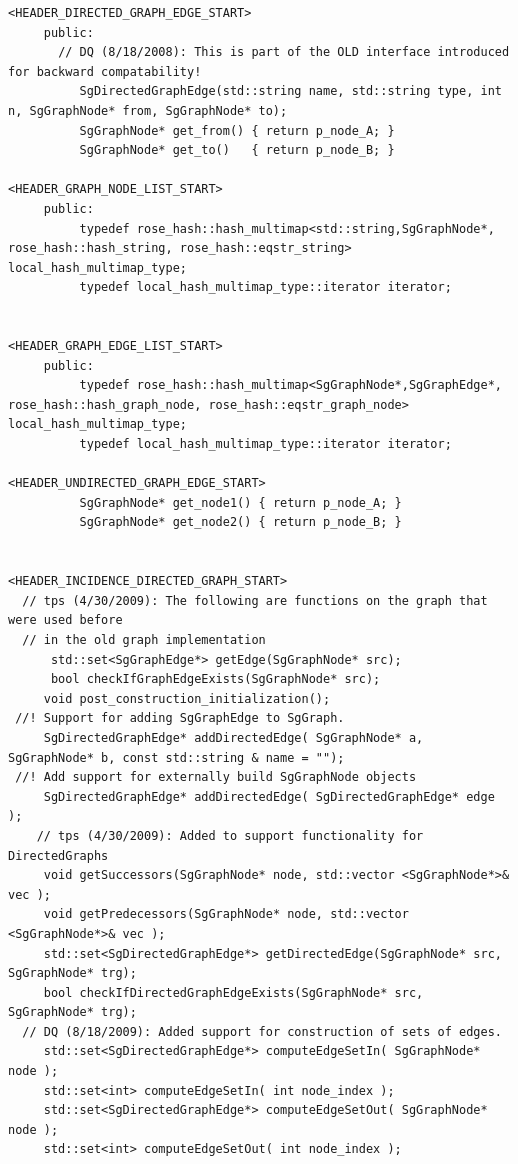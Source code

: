 \begin{enumerate}
\begin{lstlisting}
<HEADER_DIRECTED_GRAPH_EDGE_START>
     public:
       // DQ (8/18/2008): This is part of the OLD interface introduced for backward compatability!
          SgDirectedGraphEdge(std::string name, std::string type, int n, SgGraphNode* from, SgGraphNode* to);
          SgGraphNode* get_from() { return p_node_A; }
          SgGraphNode* get_to()   { return p_node_B; }

<HEADER_GRAPH_NODE_LIST_START>
     public:
          typedef rose_hash::hash_multimap<std::string,SgGraphNode*, rose_hash::hash_string, rose_hash::eqstr_string> local_hash_multimap_type;
          typedef local_hash_multimap_type::iterator iterator;


<HEADER_GRAPH_EDGE_LIST_START>
     public:
          typedef rose_hash::hash_multimap<SgGraphNode*,SgGraphEdge*, rose_hash::hash_graph_node, rose_hash::eqstr_graph_node> local_hash_multimap_type;
          typedef local_hash_multimap_type::iterator iterator;

<HEADER_UNDIRECTED_GRAPH_EDGE_START>
          SgGraphNode* get_node1() { return p_node_A; }
          SgGraphNode* get_node2() { return p_node_B; }


<HEADER_INCIDENCE_DIRECTED_GRAPH_START>
  // tps (4/30/2009): The following are functions on the graph that were used before 
  // in the old graph implementation
  	  std::set<SgGraphEdge*> getEdge(SgGraphNode* src);
  	  bool checkIfGraphEdgeExists(SgGraphNode* src);
     void post_construction_initialization();
 //! Support for adding SgGraphEdge to SgGraph.
     SgDirectedGraphEdge* addDirectedEdge( SgGraphNode* a, SgGraphNode* b, const std::string & name = "");
 //! Add support for externally build SgGraphNode objects
     SgDirectedGraphEdge* addDirectedEdge( SgDirectedGraphEdge* edge  );
	// tps (4/30/2009): Added to support functionality for DirectedGraphs		   
     void getSuccessors(SgGraphNode* node, std::vector <SgGraphNode*>& vec );
     void getPredecessors(SgGraphNode* node, std::vector <SgGraphNode*>& vec );
     std::set<SgDirectedGraphEdge*> getDirectedEdge(SgGraphNode* src, SgGraphNode* trg);
     bool checkIfDirectedGraphEdgeExists(SgGraphNode* src, SgGraphNode* trg);
  // DQ (8/18/2009): Added support for construction of sets of edges.
     std::set<SgDirectedGraphEdge*> computeEdgeSetIn( SgGraphNode* node );
     std::set<int> computeEdgeSetIn( int node_index );
     std::set<SgDirectedGraphEdge*> computeEdgeSetOut( SgGraphNode* node );
     std::set<int> computeEdgeSetOut( int node_index );





\end{lstlisting}
\end{enumerate}
